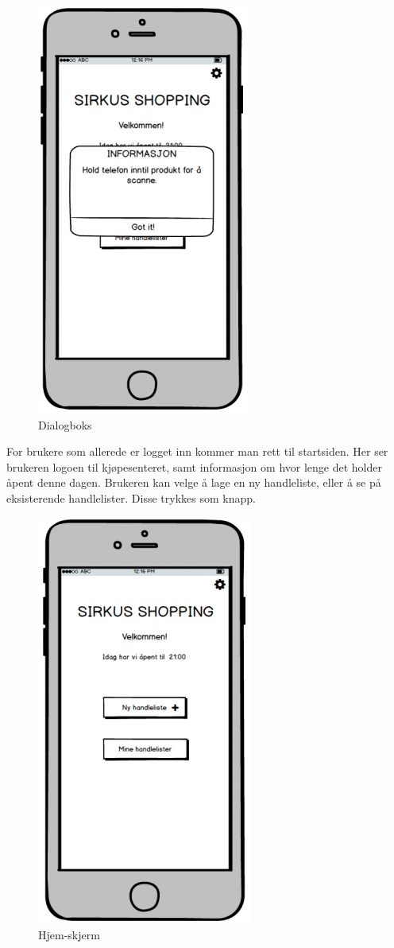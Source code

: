 \begin{figure}[H]
\includegraphics[scale=0.5]{images/prototype1/dialogboks}
\centering %
\caption{Dialogboks}
\label{fig:dialogboks}
\end{figure}

\noindent For brukere som allerede er logget inn kommer man rett til startsiden. Her ser brukeren logoen til kjøpesenteret, samt informasjon om hvor lenge det holder åpent denne dagen. Brukeren kan velge å lage en ny handleliste, eller å se på eksisterende handlelister. Disse trykkes som knapp. 

\begin{figure}[H]
\includegraphics[scale=0.5]{images/prototype1/hjem-skjerm}
\centering %
\caption{Hjem-skjerm}
\label{fig:hjem-skjerm}
\end{figure}

